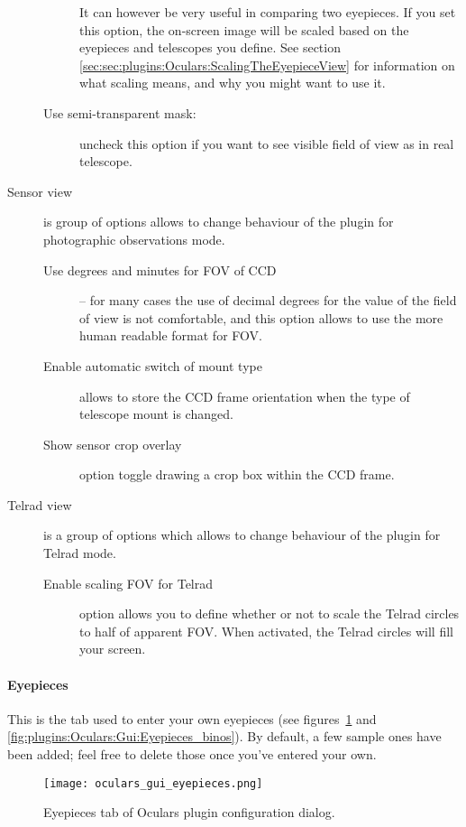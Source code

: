 \begin{description}
\begin{description}
		 It can however be very useful in comparing two eyepieces. 
		 If you set this option, the  on-screen image will be scaled based on the eyepieces and telescopes you define. 
		 See section \ref{sec:sec:plugins:Oculars:ScalingTheEyepieceView} for information on what scaling means, and why you might want to use it.
   \item[Use semi-transparent mask:] uncheck this option if you want to see visible field of view as in real telescope.
 \end{description}
\item[Sensor view] is group of options allows to change behaviour of the plugin for photographic observations mode.
 \begin{description}
   \item[Use degrees and minutes for FOV of CCD] -- for many cases the use of decimal degrees for the value of the field of view is not comfortable, and this option allows to use the more human readable format for FOV.
   \item[Enable automatic switch of mount type] allows to store the CCD frame orientation when the type of telescope mount is changed.
   \item[Show sensor crop overlay] option toggle drawing a crop box within the CCD frame.
 \end{description}
\item[Telrad view] is a group of options which allows to change behaviour of the plugin for Telrad mode.
 \begin{description}
 \item[Enable scaling FOV for Telrad] option allows you to define whether or not to scale the Telrad circles to half of apparent FOV.
   When activated, the Telrad circles will fill your screen. 
 \end{description}
\end{description}

\paragraph{Eyepieces}

This is the tab used to enter your own eyepieces (see figures~\ref{fig:plugins:Oculars:Gui:Eyepieces} and \ref{fig:plugins:Oculars:Gui:Eyepieces_binos}). 
By default, a few sample ones have been added; feel free to delete those once you've entered your own.

\begin{figure}[p]\centering
\texttt{[image: oculars\_gui\_eyepieces.png]}
\caption{Eyepieces tab of Oculars plugin configuration dialog.}
\label{fig:plugins:Oculars:Gui:Eyepieces}
\end{figure}

